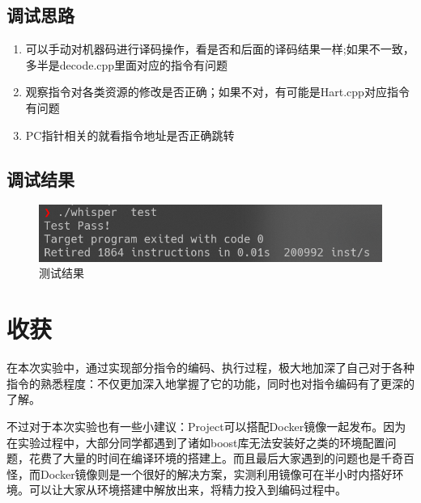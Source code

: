 \documentclass{../source/zjureport}
\begin{document}
    \subsection{调试思路}
    \begin{enumerate}
      \item 可以手动对机器码进行译码操作，看是否和后面的译码结果一样;如果不一致，多半是decode.cpp里面对应的指令有问题
      \item 观察指令对各类资源的修改是否正确；如果不对，有可能是Hart.cpp对应指令有问题
      \item PC指针相关的就看指令地址是否正确跳转
    \end{enumerate}

    \subsection{调试结果}
    \begin{figure}[H]
      \centering
      \includegraphics[width = 0.9 \textwidth]{figure/结果.png}
      \caption{测试结果}
    \end{figure}
            
    \section{收获}
    在本次实验中，通过实现部分指令的编码、执行过程，极大地加深了自己对于各种指令的熟悉程度：不仅更加深入地掌握了它的功能，同时也对指令编码有了更深的了解。

    不过对于本次实验也有一些小建议：Project可以搭配Docker镜像一起发布。因为在实验过程中，大部分同学都遇到了诸如boost库无法安装好之类的环境配置问题，花费了大量的时间在编译环境的搭建上。而且最后大家遇到的问题也是千奇百怪，而Docker镜像则是一个很好的解决方案，实测利用镜像可在半小时内搭好环境。可以让大家从环境搭建中解放出来，将精力投入到编码过程中。
\end{document}
